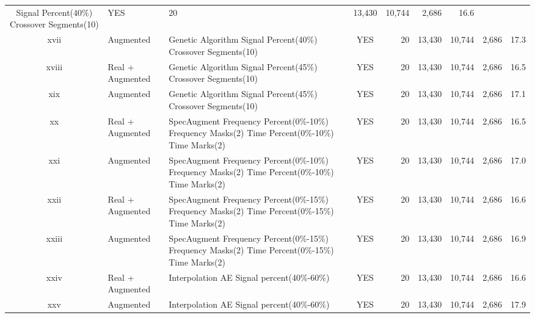 \documentclass[journal]{IEEEtran}
\begin{document}
\begin{table}
\begin{adjustbox}{width=\textwidth}
\begin{tabular}{cllcrrrrr}
  Signal Percent(40\%) Crossover Segments(10) & YES & 20 & 13,430 & 10,744 & 2,686 & 16.6 \\
xvii & Augmented & Genetic Algorithm Signal Percent(40\%) Crossover
  Segments(10) & YES & 20 & 13,430 & 10,744 & 2,686 & 17.3 \\
xviii & Real + Augmented & Genetic Algorithm
  Signal Percent(45\%) Crossover Segments(10) & YES & 20 & 13,430 & 10,744 & 2,686 & 16.5 \\
xix & Augmented & Genetic Algorithm Signal Percent(45\%) Crossover
  Segments(10) & YES & 20 & 13,430 & 10,744 & 2,686 & 17.1 \\
xx & Real + Augmented & SpecAugment
  Frequency Percent(0\%-10\%) Frequency Masks(2) Time Percent(0\%-10\%) Time
  Marks(2) & YES & 20 & 13,430 & 10,744 & 2,686 & 16.5 \\
xxi & Augmented & SpecAugment Frequency Percent(0\%-10\%) Frequency
  Masks(2) Time Percent(0\%-10\%) Time Marks(2) & YES & 20 & 13,430 & 10,744 & 2,686 & 17.0 \\
xxii & Real + Augmented & SpecAugment
  Frequency Percent(0\%-15\%) Frequency Masks(2) Time Percent(0\%-15\%) Time Marks(2) & YES & 20 & 13,430 & 10,744 & 2,686 & 16.6 \\
xxiii & Augmented & SpecAugment Frequency Percent(0\%-15\%) Frequency
  Masks(2) Time Percent(0\%-15\%) Time Marks(2) & YES & 20 & 13,430 & 10,744 & 2,686 & 16.9 \\
xxiv & Real + Augmented & Interpolation AE Signal percent(40\%-60\%) & YES & 20 & 13,430 & 10,744 & 2,686 & 16.6 \\
xxv & Augmented & Interpolation
  AE Signal percent(40\%-60\%) & YES & 20 & 13,430 & 10,744 & 2,686 & 17.9 \\
\hline %
\end{tabular}
\end{adjustbox}
\label{table:training_statistic}
\end{table}
\end{document}
